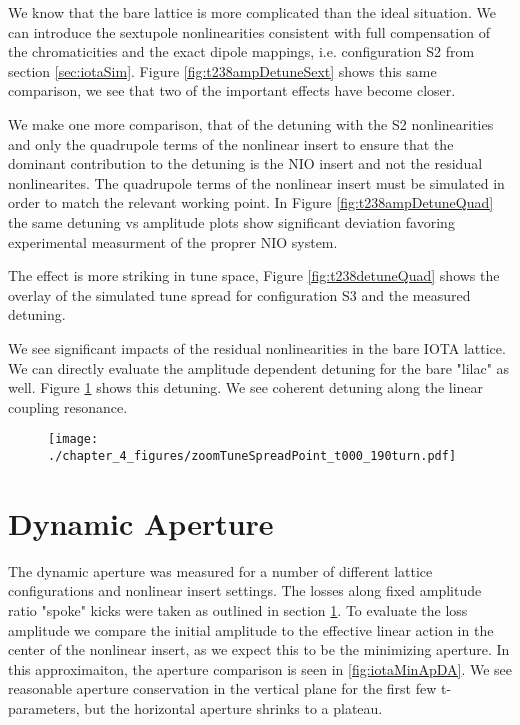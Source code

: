 We know that the bare lattice is more complicated than the ideal situation. We can introduce the sextupole nonlinearities consistent with full compensation of the chromaticities and the exact dipole mappings, i.e. configuration S2 from section \ref{sec:iotaSim}. Figure \ref{fig:t238ampDetuneSext} shows this same comparison, we see that two of the important effects have become closer.

We make one more comparison, that of the detuning with the S2 nonlinearities and only the quadrupole terms of the nonlinear insert to ensure that the dominant contribution to the detuning is the NIO insert and not the residual nonlinearites. The quadrupole terms of the nonlinear insert must be simulated in order to match the relevant working point. In Figure \ref{fig:t238ampDetuneQuad} the same detuning vs amplitude plots show significant deviation favoring experimental measurment of the proprer NIO system.

The effect is more striking in tune space, Figure \ref{fig:t238detuneQuad} shows the overlay of the simulated tune spread for configuration S3 and the measured detuning.

We see significant impacts of the residual nonlinearities in the bare IOTA lattice. We can directly evaluate the amplitude dependent detuning for the bare "lilac" as well. Figure \ref{fig:t0detune} shows this detuning. We see coherent detuning along the linear coupling resonance.

\begin{figure}
	\centering
	\texttt{[image: ./chapter\_4\_figures/zoomTuneSpreadPoint\_t000\_190turn.pdf]}
	\caption{}
	\label{fig:t0detune}
\end{figure}

\section{Dynamic Aperture} \label{sec:DA}
The dynamic aperture was measured for a number of different lattice configurations and nonlinear insert settings. The losses along fixed amplitude ratio "spoke" kicks were taken as outlined in section \ref{sec:DA}. To evaluate the loss amplitude we compare the initial amplitude to the effective linear action in the center of the nonlinear insert, as we expect this to be the minimizing aperture. In this approximaiton, the aperture comparison is seen in \ref{fig:iotaMinApDA}. We see reasonable aperture conservation in the vertical plane for the first few t-parameters, but the horizontal aperture shrinks to a plateau.

